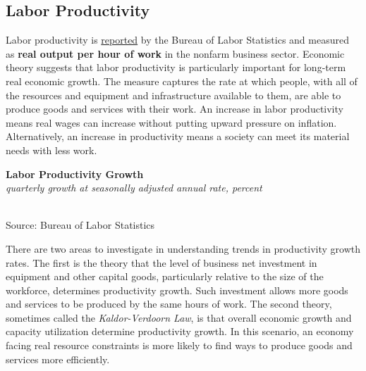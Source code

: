 \documentclass{report}
\makeatletter
\newcommand{\tbllink}[1]{\href{https://raw.githubusercontent.com/bdecon/US-chartbook/master/chartbook/data/#1}{\faTable}}
\newcommand*\short[1]{\expandafter\@gobbletwo\number\numexpr#1\relax}
\newcommand{\sbar}[4]{
		\addplot[ybar stacked, bar width=2.5pt, draw opacity=0, fill=#1] 
			table [x=#2, y=#3, col sep=comma]{#4};}
\newcommand{\dateaxisticks}{
		date coordinates in=x, axis line style={draw=none},
		xmax={2021-06-15},
		max space between ticks=40,	    
		xtick={{1990-01-01}, {1992-01-01}, {1994-01-01}, 
			{1996-01-01}, {1998-01-01}, {2000-01-01}, 
			{2002-01-01}, {2004-01-01}, {2006-01-01},
			{2008-01-01}, {2010-01-01}, {2012-01-01}, {2014-01-01},
		    {2016-01-01}, {2018-01-01}, {2020-01-01}},
		minor xtick={{1989-01-01}, {1991-01-01}, {1993-01-01},
			{1995-01-01}, {1997-01-01}, {1999-01-01}, 
			{2001-01-01}, {2003-01-01}, {2005-01-01}, {2007-01-01},
		    {2009-01-01}, {2011-01-01}, {2013-01-01}, {2015-01-01},
		    {2017-01-01}, {2019-01-01}, {2021-01-01}},
		enlarge y limits={0.06}, enlarge x limits={0.01},
		}
\newcommand{\bbar}[2]{extra #1 ticks = {{#2}}, extra #1 tick labels = ,
		extra #1 tick style = {grid=major, grid style={thick, black!25}},}
\newcommand{\rbars}{
		\fill[color=black!10] (axis cs:{1990-07-01},\pgfkeysvalueof{/pgfplots/ymin}) rectangle 
			(axis cs:{1991-03-01}, \pgfkeysvalueof{/pgfplots/ymax});
		\fill[color=black!10] (axis cs:{2007-12-01},\pgfkeysvalueof{/pgfplots/ymin}) rectangle 
			(axis cs:{2009-07-01}, \pgfkeysvalueof{/pgfplots/ymax});
		\fill[color=black!10] (axis cs:{2001-03-01},\pgfkeysvalueof{/pgfplots/ymin}) rectangle 
			(axis cs:{2001-11-01}, \pgfkeysvalueof{/pgfplots/ymax});
		\fill[color=black!10] (axis cs:{2020-02-01},\pgfkeysvalueof{/pgfplots/ymin}) rectangle 
			(axis cs:{2021-06-15}, \pgfkeysvalueof{/pgfplots/ymax});}
\makeatother
\begin{document}
{{\begin{minipage}{0.76\textwidth}
\subsection*{\color{black!70} \seriffont Labor Productivity}
\small Labor productivity is \href{https://www.bls.gov/news.release/prod2.nr0.htm}{reported} by the Bureau of Labor Statistics and measured as \textbf{real output per hour of work} in the nonfarm business sector. Economic theory suggests that labor productivity is particularly important for long-term real economic growth. The measure captures the rate at which people, with all of the resources and equipment and infrastructure available to them, are able to produce goods and services with their work. An increase in labor productivity means real wages can increase without putting upward pressure on inflation. Alternatively, an increase in productivity means a society can meet its material needs with less work.


\vspace{3mm}

\normalsize \textbf{Labor Productivity Growth}\\
\footnotesize{\textit{quarterly growth at seasonally adjusted annual rate, percent}}\\
\hspace*{-2mm} \\
\footnotesize{Source: Bureau of Labor Statistics} \hfill \tbllink{lprod.csv}
\vspace{3mm}

\small There are two areas to investigate in understanding trends in productivity growth rates. The first is the theory that the level of business net investment in equipment and other capital goods, particularly relative to the size of the workforce, determines productivity growth. Such investment allows more goods and services to be produced by the same hours of work. The second theory, sometimes called the \textit{Kaldor-Verdoorn Law}, is that overall economic growth and capacity utilization determine productivity growth. In this scenario, an economy facing real resource constraints is more likely to find ways to produce goods and services more efficiently.
\end{minipage}
\newpage
\begin{minipage}{0.76\textwidth}

\end{minipage}}}
\end{document}
